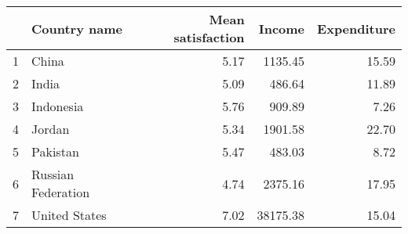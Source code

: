 \begin{table}[ht]
\centering
\begin{tabular}{rlrrr}
  \hline
 & Country name & Mean satisfaction & Income & Expenditure \\ 
  \hline
1 & China & 5.17 & 1135.45 & 15.59 \\ 
  2 & India & 5.09 & 486.64 & 11.89 \\ 
  3 & Indonesia & 5.76 & 909.89 & 7.26 \\ 
  4 & Jordan & 5.34 & 1901.58 & 22.70 \\ 
  5 & Pakistan & 5.47 & 483.03 & 8.72 \\ 
  6 & Russian Federation & 4.74 & 2375.16 & 17.95 \\ 
  7 & United States & 7.02 & 38175.38 & 15.04 \\ 
   \hline
\end{tabular}
\end{table}
